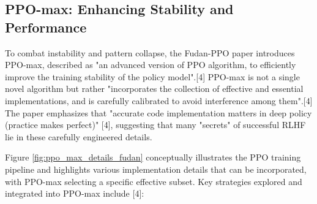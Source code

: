 \documentclass[10pt,journal,compsoc]{IEEEtran} %
\begin{document}

\subsection{PPO-max: Enhancing Stability and Performance}
To combat instability and pattern collapse, the Fudan-PPO paper introduces PPO-max, described as "an advanced version of PPO algorithm, to efficiently improve the training stability of the policy model".[4] PPO-max is not a single novel algorithm but rather "incorporates the collection of effective and essential implementations, and is carefully calibrated to avoid interference among them".[4] The paper emphasizes that "accurate code implementation matters in deep policy (practice makes perfect)" [4], suggesting that many "secrets" of successful RLHF lie in these carefully engineered details.

Figure \ref{fig:ppo_max_details_fudan} conceptually illustrates the PPO training pipeline and highlights various implementation details that can be incorporated, with PPO-max selecting a specific effective subset. Key strategies explored and integrated into PPO-max include [4]:

\end{document}

